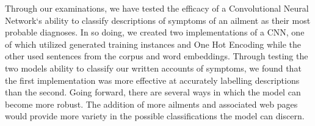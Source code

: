 \documentclass[12pt]{report}
\begin{document}
Through our examinations, we have tested the efficacy of a Convolutional Neural
Network`s ability to classify descriptions of symptoms of an ailment as their
most probable diagnoses. In so doing, we created two implementations of a CNN,
one of which utilized generated training instances and One Hot Encoding while
the other used sentences from the corpus and word embeddings. Through testing
the two models ability to classify our written accounts of symptoms, we found
that the first implementation was more effective at accurately labelling
descriptions than the second. Going forward, there are several ways in which the
model can become more robust. The addition of more ailments and associated web
pages would provide more variety in the possible classifications the model can
discern.

%
\end{document}
